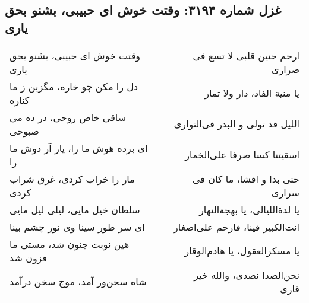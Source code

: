 \begin{center}
\section*{غزل شماره ۳۱۹۴: وقتت خوش ای حبیبی، بشنو بحق یاری}
\label{sec:3194}
\begin{longtable}{l p{0.5cm} r}
وقتت خوش ای حبیبی، بشنو بحق یاری
&&
ارحم حنین قلبی لا تسع فی ضراری
\\
دل را مکن چو خاره، مگزین ز ما کناره
&&
یا منیة الفاد، دار ولا تمار
\\
ساقی خاص روحی، در ده می صبوحی
&&
اللیل قد تولی و البدر فی‌التواری
\\
ای برده هوش ما را، یار آر دوش ما را
&&
اسقیتنا کسا صرفا علی‌الخمار
\\
مار را خراب کردی، غرق شراب کردی
&&
حتی بدا و افشا، ما کان فی سراری
\\
سلطان خیل مایی، لیلی لیل مایی
&&
یا لدةاللیالی، یا بهجةالنهار
\\
ای سر طور سینا وی نور چشم بینا
&&
انت‌الکبیر فینا، فارحم علی‌اصغار
\\
هین نوبت جنون شد، مستی ما فزون شد
&&
یا مسکرالعقول، یا هادم‌الوقار
\\
شاه سخن‌ور آمد، موج سخن درآمد
&&
نحن‌الصدا نصدی، والله خیر قاری
\\
\end{longtable}
\end{center}
